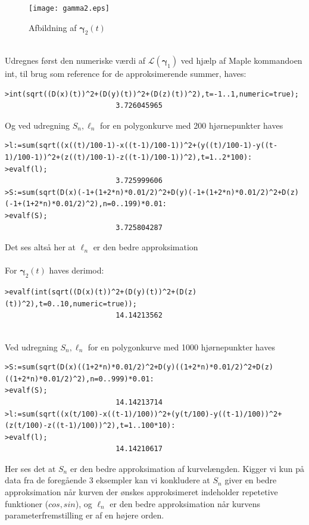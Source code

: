 \begin{figure}[ht]
\center
\texttt{[image: gamma2.eps]}
\caption{Afbildning af \(\pmb{\gamma}_2(t)\)}
\label{gamma2graf}
\end{figure}
\\
Udregnes først den numeriske værdi af \(\mathscr{L}(\pmb{\gamma}_1)\) ved hjælp af Maple kommandoen int, til brug som reference for de approksimerende summer, haves:
\begin{lstlisting}[caption=Reference til \(\mathscr{L}(\pmb{\gamma}_1)\)]
>int(sqrt((D(x)(t))^2+(D(y)(t))^2+(D(z)(t))^2),t=-1..1,numeric=true);
                          3.726045965

\end{lstlisting}
Og ved udregning \(S_n,\ell_n\) for en polygonkurve med 200 hjørnepunkter haves
\begin{lstlisting}[caption={Længden af polygonkurven udregnet hvor \( \mbox{l}=\ell_n\) og \(\mbox{S}=S_n\) }]
>l:=sum(sqrt((x((t)/100-1)-x((t-1)/100-1))^2+(y((t)/100-1)-y((t-1)/100-1))^2+(z((t)/100-1)-z((t-1)/100-1))^2),t=1..2*100):
>evalf(l);
                          3.725999606
>S:=sum(sqrt(D(x)(-1+(1+2*n)*0.01/2)^2+D(y)(-1+(1+2*n)*0.01/2)^2+D(z)(-1+(1+2*n)*0.01/2)^2),n=0..199)*0.01:
>evalf(S);
                          3.725804287

\end{lstlisting}
Det ses altså her at \(\ell_n\) er den bedre approksimation \\
\\
For \(\pmb{\gamma}_2(t)\) haves derimod:
\begin{lstlisting}[caption=Reference til \(\mathscr{L}(\pmb{\gamma}_2)\)]
>evalf(int(sqrt((D(x)(t))^2+(D(y)(t))^2+(D(z)(t))^2),t=0..10,numeric=true));
                          14.14213562


\end{lstlisting}
Ved udregning \(S_n,\ell_n\) for en polygonkurve med 1000 hjørnepunkter haves
\begin{lstlisting}[caption={Længden af polygonkurven udregnet hvor \( \mbox{l}=\ell_n\) og \(\mbox{S}=S_n\) }]
>S:=sum(sqrt(D(x)((1+2*n)*0.01/2)^2+D(y)((1+2*n)*0.01/2)^2+D(z)((1+2*n)*0.01/2)^2),n=0..999)*0.01:
>evalf(S);
                          14.14213714
>l:=sum(sqrt((x(t/100)-x((t-1)/100))^2+(y(t/100)-y((t-1)/100))^2+(z(t/100)-z((t-1)/100))^2),t=1..100*10):
>evalf(l);
                          14.14210617

\end{lstlisting}
Her ses det at \(S_n\) er den bedre approksimation af kurvelængden. Kigger vi kun på data fra de foregående 3 eksempler kan vi konkludere at \(S_n\) giver en bedre approksimation når kurven der ønskes approksimeret indeholder repetetive funktioner (\(cos,sin\)), og \(\ell_n\) er den bedre approksimation når kurvens parameterfremstilling er af en højere orden.

